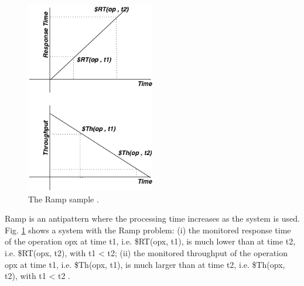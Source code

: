\begin{figure}[h]
\begin{minipage}{.5\textwidth}
\centering
\includegraphics[width=0.5\textwidth]{./images/ramp.png}
\caption{The Ramp sample \cite{Vetoio2011}.}
\label{fig:ramp}
\end{minipage}
\end{figure}

Ramp is an antipattern where the processing time increases as the system is used. Fig. \ref{fig:ramp} shows a system  with the Ramp problem:  (i) the monitored response time of the operation opx at time t1, i.e. \$RT(opx, t1), is much lower than at time t2, i.e. \$RT(opx, t2), with t1 < t2; (ii) the monitored throughput of the operation opx at time t1, i.e. \$Th(opx, t1), is much larger than at time t2, i.e. \$Th(opx, t2), with t1 < t2 \cite{Wert2014}. 